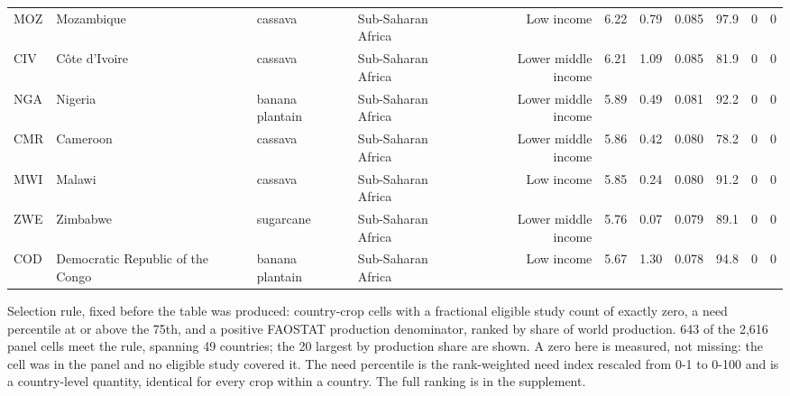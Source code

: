 \begin{table}[htbp]
\begin{tabular}{llllrrrrrrr}
MOZ & Mozambique & cassava & Sub-Saharan Africa  & Low income & 6.22 & 0.79 & 0.085 & 97.9 & 0 & 0 \\
CIV & Côte d'Ivoire & cassava & Sub-Saharan Africa  & Lower middle income & 6.21 & 1.09 & 0.085 & 81.9 & 0 & 0 \\
NGA & Nigeria & banana plantain & Sub-Saharan Africa  & Lower middle income & 5.89 & 0.49 & 0.081 & 92.2 & 0 & 0 \\
CMR & Cameroon & cassava & Sub-Saharan Africa  & Lower middle income & 5.86 & 0.42 & 0.080 & 78.2 & 0 & 0 \\
MWI & Malawi & cassava & Sub-Saharan Africa  & Low income & 5.85 & 0.24 & 0.080 & 91.2 & 0 & 0 \\
ZWE & Zimbabwe & sugarcane & Sub-Saharan Africa  & Lower middle income & 5.76 & 0.07 & 0.079 & 89.1 & 0 & 0 \\
COD & Democratic Republic of the Congo & banana plantain & Sub-Saharan Africa  & Low income & 5.67 & 1.30 & 0.078 & 94.8 & 0 & 0 \\
\bottomrule
\end{tabular}
\begin{minipage}{\linewidth}\footnotesize
Selection rule, fixed before the table was produced: country-crop cells with a fractional eligible study count of exactly zero, a need percentile at or above the 75th, and a positive FAOSTAT production denominator, ranked by share of world production. 643 of the 2,616 panel cells meet the rule, spanning 49 countries; the 20 largest by production share are shown. A zero here is measured, not missing: the cell was in the panel and no eligible study covered it. The need percentile is the rank-weighted need index rescaled from 0-1 to 0-100 and is a country-level quantity, identical for every crop within a country. The full ranking is in the supplement.
\end{minipage}
\end{table}
